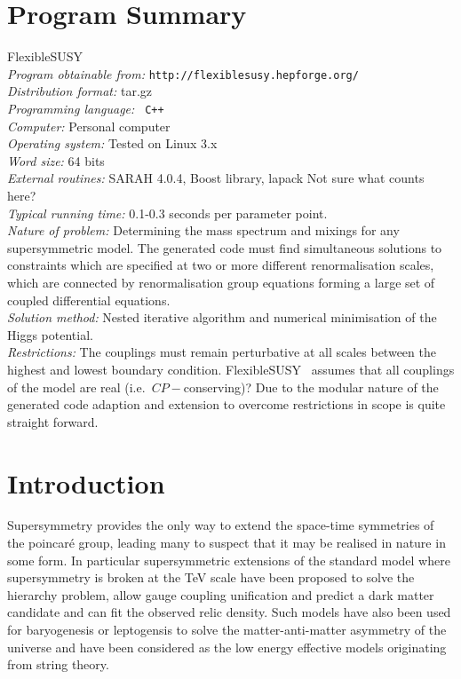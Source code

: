 \documentclass[final,3p,times,pdflatex]{elsarticle}
\newcommand{\fs}{FlexibleSUSY\xspace}
\begin{document}
\section{Program Summary}
 \fs\\ {\em Program obtainable from:}
         {\tt http://flexiblesusy.hepforge.org/}\\ {\em Distribution
           format:}\/ tar.gz\\ {\em Programming language:} {\tt
           C++}\\ {\em Computer:}\/ Personal computer\\ {\em Operating
           system:}\/ Tested on Linux 3.x\\ {\em Word size:}\/ 64
         bits\\ {\em External routines:}\/ SARAH 4.0.4, Boost library,
         lapack {\color{red} Not sure what counts here?}\\ {\em
           Typical running time:}\/ 0.1-0.3 seconds per parameter
         point.\\ {\em Nature of problem:}\/ Determining the mass
         spectrum and mixings for any supersymmetric model. The
         generated code must find simultaneous solutions to
         constraints which are specified at two or more different
         renormalisation scales, which are connected by
         renormalisation group equations forming a large set of
         coupled differential equations. \\ {\em Solution method:}\/
         Nested iterative algorithm and numerical minimisation of the
         Higgs potential.  \\ {\em Restrictions:} The couplings must
         remain perturbative at all scales between the highest and
         lowest boundary condition.  \fs~ assumes that all couplings
         of the model are real (i.e.\ $CP-$conserving)?  Due to the
         modular nature of the generated code adaption and extension
         to overcome restrictions in scope is quite straight forward.


\newpage
\section{Introduction}
Supersymmetry provides the only way to extend the space-time
symmetries of the poincar\'e group\cite{}, leading many to suspect
that it may be realised in nature in some form. In particular
supersymmetric extensions of the standard model where supersymmetry is
broken at the TeV scale have been proposed to solve the hierarchy
problem\cite{}, allow gauge coupling unification\cite{} and predict a
dark matter candidate\cite{} and can fit the observed relic
density\cite{}.  Such models have also been used for
baryogenesis\cite{} or leptogensis\cite{} to solve the
matter-anti-matter asymmetry of the universe and have been considered
as the low energy effective models originating from string
theory\cite{}.
\end{document}
